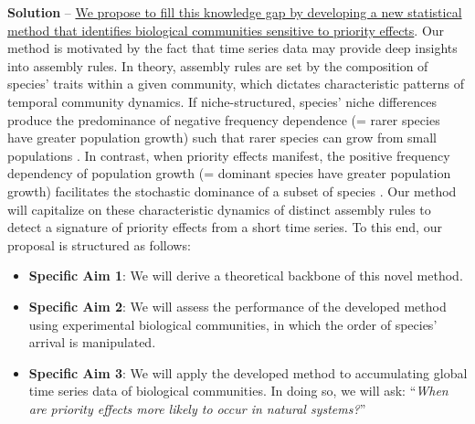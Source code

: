 \documentclass[12pt, class=article, crop=false]{standalone}
\begin{document}
\textbf{Solution} --
\ul{We propose to fill this knowledge gap by developing a new statistical method that identifies biological communities sensitive to priority effects}.
Our method is motivated by the fact that time series data may provide deep insights into assembly rules.
In theory, assembly rules are set by the composition of species' traits within a given community, which dictates characteristic patterns of temporal community dynamics.
If niche-structured, species' niche differences produce the predominance of negative frequency dependence (= rarer species have greater population growth) such that rarer species can grow from small populations \citep{ke_coexistence_2018}.
In contrast, when priority effects manifest, the positive frequency dependency of population growth (= dominant species have greater population growth) facilitates the stochastic dominance of a subset of species \citep{ke_coexistence_2018}.
Our method will capitalize on these characteristic dynamics of distinct assembly rules to detect a signature of priority effects from a short time series.
To this end, our proposal is structured as follows:

\begin{itemize}
    \item \textbf{Specific Aim 1}: We will derive a theoretical backbone of this novel method.
    \item \textbf{Specific Aim 2}: We will assess the performance of the developed method using experimental biological communities, in which the order of species' arrival is manipulated.
    \item \textbf{Specific Aim 3}: We will apply the developed method to accumulating global time series data of biological communities. In doing so, we will ask: ``\textit{When are priority effects more likely to occur in natural systems?}''
\end{itemize}
\end{document}
